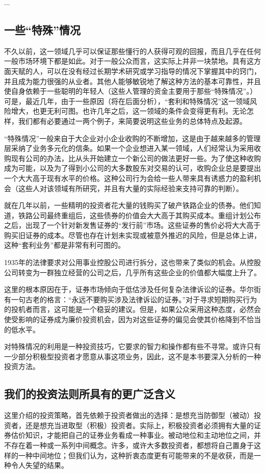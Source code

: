 \documentclass[12pt,oneside]{book}
\begin{document}
...

\subsection{一些“特殊”情况}
不久以前，这一领域几乎可以保证那些懂行的人获得可观的回报，而且几乎在任何一般市场环境下都是如此。对于一般公众而言，这实际上并非一块禁地。具有这方面天赋的人，可以在没有经过长期学术研究或学习指导的情况下掌握其中的窍门，并且成为能力很强的从业者。其他人能够敏锐地了解这种方法的基本可靠性，并且使自身依赖于一些聪明的年轻人（这些人管理的资金主要用于那些“特殊情况”。）可是，最近几年，由于一些原因（将在后面分析），“套利和特殊情况”这一领域风险增大，也更无利可图。也许几年之后，这一领域的条件会变得更有利。无论怎样，我们都有必要通过一两个例子，来简要说明这些业务的总体特点及起源。

“特殊情况”一般来自于大企业对小企业收购的不断增加，这是由于越来越多的管理层采纳了业务多元化的信条。如果一个企业想进入某一领域，人们经常认为采用收购现有公司的办法，比从头开始建立一个新公司的做法更好一些。为了使这种收购成为可能，以及为了得到小公司的大多数股东对交易的认可，收购企业总是要提出一个大大高于现有水平的价格。这种公司行为会给一些人带来具有诱惑力的盈利机会（这些人对该领域有所研究，并且有大量的实际经验来支持可靠的判断）。

就在几年以前，一些精明的投资者花大量的钱购买了破产铁路企业的债券。他们知道，铁路公司最终重组后，这些债券的价值会大大高于其购买成本。重组计划公布之后，出现了一个针对新发售证券的“发行前”市场。这些证券的售价必将大大高于购买旧证券的成本。尽管也存在计划未实现或被意外推迟的风险，但是总体上讲，这种“套利业务”都是非常有利可图的。

1935年的法律要求对公用事业控股公司进行拆分，这也带来了类似的机会。从控股公司转变为一群独立经营的公司之后，几乎所有这些企业的价值都大幅度上升了。

这里的根本原因在于，证券市场倾向于低估涉及任何复杂法律诉讼的证券。华尔街有一句古老的格言：“永远不要购买涉及法律诉讼的证券。”对于寻求短期购买行为的投机者而言，这可能是一个稳妥的建议。但是，如果公众采用这种态度，必然会使受影响的证券成为廉价投资机会，因为对这些证券的偏见会使其价格降到不恰当的低水平。

对特殊情况的利用是一种投资技巧，它要求的智力和操作都有些不寻常。或许只有一少部分积极型投资者才愿意从事这项业务，因此，这不是本书要深入分析的一种投资方法。

\subsection{我们的投资法则所具有的更广泛含义}
这里介绍的投资策略，首先依赖于投资者做出的选择：是想充当防御型（被动）投资者，还是想充当进取型（积极）投资者。实际上，积极投资者必须拥有大量的证券估价知识，才能把自己的证券业务看成一种事业。被动地位和主动地位之间，并不存在着一种或一系列中间概念。许多，或许大多数投资者，都想将自己置身于这样的一种中间地位；但我们认为，这种折衷态度更有可能带来的不是收获，而是一种令人失望的结果。
\end{document}
